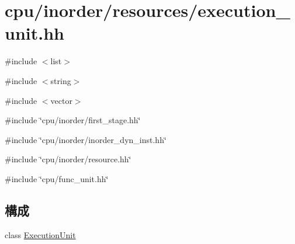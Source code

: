 \hypertarget{execution__unit_8hh}{
\section{cpu/inorder/resources/execution\_\-unit.hh}
\label{execution__unit_8hh}
}
{\ttfamily \#include $<$list$>$}\par
{\ttfamily \#include $<$string$>$}\par
{\ttfamily \#include $<$vector$>$}\par
{\ttfamily \#include \char`\"{}cpu/inorder/first\_\-stage.hh\char`\"{}}\par
{\ttfamily \#include \char`\"{}cpu/inorder/inorder\_\-dyn\_\-inst.hh\char`\"{}}\par
{\ttfamily \#include \char`\"{}cpu/inorder/resource.hh\char`\"{}}\par
{\ttfamily \#include \char`\"{}cpu/func\_\-unit.hh\char`\"{}}\par
\subsection*{構成}
\begin{DoxyCompactItemize}
\item 
class \hyperlink{classExecutionUnit}{ExecutionUnit}
\end{DoxyCompactItemize}
